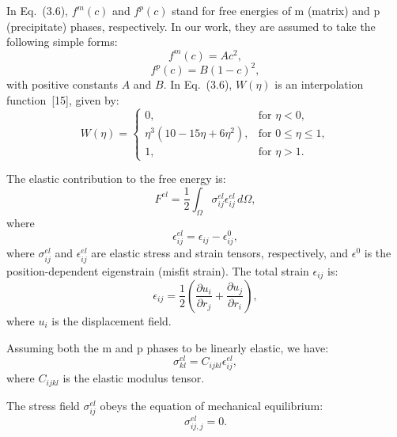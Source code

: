In Eq.~(3.6), $f^{m}(c)$ and $f^p(c)$ stand for free energies of m (matrix) and p (precipitate) phases, respectively. In our work, they are assumed to take the following simple forms:
\begin{equation}
f^{m}(c)=Ac^2,
\end{equation}
\begin{equation}
f^p(c)=B(1-c)^2,
\end{equation}
with positive constants $A$ and $B$. In Eq.~(3.6), $W(\eta)$ is an interpolation function~[15], given by:
\begin{equation}
W(\eta)=
\begin{cases}
0, & \text{for } \eta<0, \\
\eta^3(10-15\eta+6\eta^2), & \text{for } 0\leq \eta\leq 1, \\
1, & \text{for } \eta>1.
\end{cases}
\end{equation}

The elastic contribution to the free energy is:
\begin{equation}
F^{el}=\frac{1}{2}\int_\Omega \sigma_{ij}^{el}\epsilon_{ij}^{el}\,d\Omega,
\end{equation}
where
\begin{equation}
\epsilon_{ij}^{el}=\epsilon_{ij}-\epsilon_{ij}^{0},
\end{equation}
where $\sigma_{ij}^{el}$ and $\epsilon_{ij}^{el}$ are elastic stress and strain tensors, respectively, and $\epsilon^0$ is the position-dependent eigenstrain (misfit strain). The total strain $\epsilon_{ij}$ is:
\begin{equation}
\epsilon_{ij}=\frac{1}{2}\left(\frac{\partial u_i}{\partial r_j}+\frac{\partial u_j}{\partial r_i}\right),
\end{equation}
where $u_i$ is the displacement field.

Assuming both the m and p phases to be linearly elastic, we have:
\begin{equation}
\sigma_{kl}^{el}=C_{ijkl}\epsilon_{ij}^{el},
\end{equation}
where $C_{ijkl}$ is the elastic modulus tensor.

The stress field $\sigma_{ij}^{el}$ obeys the equation of mechanical equilibrium:
\begin{equation}
\sigma_{ij,j}^{el}=0.
\end{equation}

